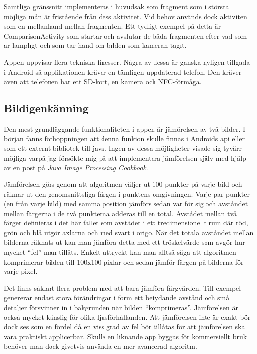 \documentclass[11px, a4paper]{article}
\begin{document}
	Samtliga gränssnitt implementeras i huvudsak som fragment som i största möjliga mån är fristående från dess aktivitet. Vid behov används dock aktiviten som en mellanhand mellan fragmenten\cite{FragmentCommunication}. Ett tydligt exempel på detta är ComparisonActivity som startar och avslutar de båda fragmenten efter vad som är lämpligt och som tar hand om bilden som kameran tagit.

	Appen uppvisar flera tekniska finesser. Några av dessa är ganska nyligen tillgada i Android så applikationen kräver en tämligen uppdaterad telefon. Den kräver även att telefonen har ett SD-kort, en kamera och NFC-förmåga.

\subsection{Bildigenkänning}
\label{subsec:image_recog}
	Den mest grundläggande funktionaliteten i appen är jämörelsen av två bilder. I början fanns förhoppningen att denna funkion skulle finnas i Androids api eller som ett externt bibliotek till java. Ingen av dessa möjligheter visade sig tyvärr möjliga varpå jag försökte mig på att implementera jämförelsen själv med hjälp av en post på \emph{Java Image Processing Cookbook}\cite{ImageComparison}.

	Jämförelsen görs genom att algoritmen väljer ut 100 punkter på varje bild och räknar ut den genomsnittsliga färgen i punktens omgivningen. Varje par punkter (en från varje bild) med samma position jämförs sedan var för sig och avståndet mellan färgerna i de två punkterna adderas till en total. Avstådet mellan två färger definieras i det här fallet som avstådet i ett tredimensionellt rum där röd, grön och blå utgör axlarna och med svart i origo. När det totala avståndet mellan bilderna räknats ut kan man jämföra detta med ett tröskelvärde som avgör hur mycket ``fel'' man tillåts. Enkelt uttryckt kan man alltså säga att algoritmen komprimerar bilden till 100x100 pixlar och sedan jämför färgen på bilderna för varje pixel.

	Det finns såklart flera problem med att bara jämföra färgvärden. Till exempel genererar endast stora förändringar i form ett betydande avstånd och små detaljer försvinner in i bakgrunden när bilden ``komprimeras''. Jämförelsen är också mycket känslig för olika ljusförhållanden. Att jämförelsen inte är exakt bör dock ses som en fördel då en viss grad av fel bör tillåtas för att jämförelsen ska vara praktiskt applicerbar. Skulle en liknande app byggas för kommersiellt bruk behöver man dock givetvis använda en mer avancerad algoritm.
\end{document}
